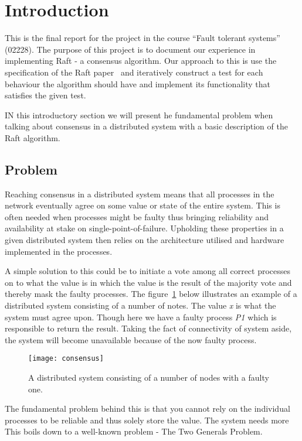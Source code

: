 \setcounter{page}{1}

\section{Introduction} %
\label{sec:introduction}

This is the final report for the project in the course ``Fault tolerant systems'' (02228). The purpose of this project is to document our experience in implementing Raft - a consensus algorithm. Our approach to this is use the specification of the Raft paper~\cite[p.~4]{Raft} and iteratively construct a test for each behaviour the algorithm should have and implement its functionality that satisfies the given test.

IN this introductory section we will present he fundamental problem when talking about consensus in a distributed system with a basic description of the Raft algorithm.

\subsection{Problem}
Reaching consensus in a distributed system means that all processes in the network eventually agree on some value or state of the entire system. This is often needed when processes might be faulty thus bringing reliability and availability at stake on single-point-of-failure. Upholding these properties in a given distributed system then relies on the architecture utilised and hardware implemented in the processes.

A simple solution to this could be to initiate a vote among all correct processes on to what the value is in which the value is the result of the majority vote and thereby mask the faulty processes. The figure~\ref{consensus} below illustrates an example of a distributed system consisting of a number of notes. The value \textit{x} is what the system must agree upon. Though here we have a faulty process \textit{P1} which is responsible to return the result. Taking the fact of connectivity of system aside, the system will become unavailable because of the now faulty process.

\begin{figure}[h]
	\centering
	\texttt{[image: consensus]}
	\caption{A distributed system consisting of a number of nodes with a faulty one.}
	\label{consensus}
\end{figure}

The fundamental problem behind this is that you cannot rely on the individual processes to be reliable and thus solely store the value. The system needs more This boils down to a well-known problem - The Two Generals Problem.


